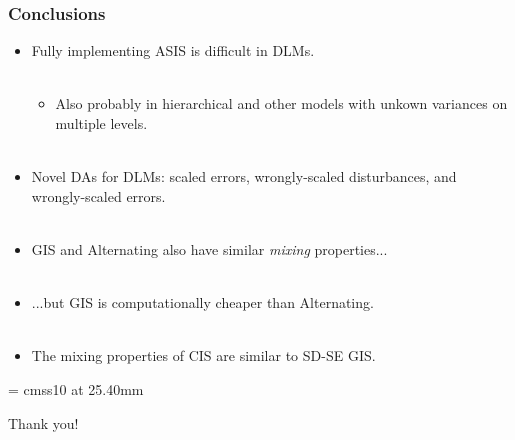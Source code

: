 \documentclass[xcolor=dvipsnames]{beamer}
\begin{document}
\begin{frame}
\frametitle{Conclusions}
\begin{itemize}
\item Fully implementing ASIS is difficult in DLMs.\\~\\
\begin{itemize}
\item[]Also probably in hierarchical and other models with unkown variances on multiple levels.\\~\\
\end{itemize}

\item Novel DAs for DLMs: scaled errors, wrongly-scaled disturbances, and wrongly-scaled errors.\\~\\

\item GIS and Alternating also have similar {\it mixing} properties...\\~\\

\item ...but GIS is computationally cheaper than Alternating.\\~\\

\item The mixing properties of CIS are similar to SD-SE GIS.

\end{itemize}
\end{frame}

\appendix
{}
\setcounter{finalframe}{\value{framenumber}}

\begin{frame}

      \begin{center}

        \font\endfont = cmss10 at 25.40mm
        \color{Red}
        \endfont 
        \baselineskip 20.0mm

        Thank you!

      \end{center}    


\end{frame}
\end{document}
